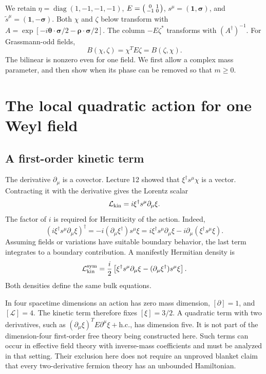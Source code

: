\documentclass[11pt]{article}
\newcommand{\Lag}{\mathcal{L}}
\newcommand{\one}{\mathbf 1}
\newcommand{\hc}{\mathrm{h.c.}}
\newcommand{\diag}{\operatorname{diag}}
\begin{document}
\begin{keyidea}
We retain \(\eta=\diag(1,-1,-1,-1)\),
\(E=\begin{psmallmatrix}0&1\\-1&0\end{psmallmatrix}\),
\(s^\mu=(\one,\bm\sigma)\), and
\(\widetilde s^\mu=(\one,-\bm\sigma)\).
Both \(\chi\) and \(\zeta\) below transform with
\(A=\exp[-i\bm\theta\cdot\bm\sigma/2-\bm\rho\cdot\bm\sigma/2]\).
The column \(-E\zeta^*\) transforms with \((A^\dagger)^{-1}\).
For Grassmann-odd fields,
\[
 B(\chi,\zeta)=\chi^T E\zeta=B(\zeta,\chi).
\]
The bilinear is nonzero even for one field. We first allow a complex
mass parameter, and then show when its phase can be removed so that
\(m\geq0\).
\end{keyidea}

\section{The local quadratic action for one Weyl field}
\subsection{A first-order kinetic term}
The derivative \(\partial_\mu\) is a covector. Lecture 12 showed that
\(\xi^\dagger s^\mu\chi\) is a vector. Contracting it with the
derivative gives the Lorentz scalar
\begin{equation}
 \Lag_{\rm kin}=i\xi^\dagger s^\mu\partial_\mu\xi.
 \label{weyl:eq:weylkin}
\end{equation}
The factor of \(i\) is required for Hermiticity of the action. Indeed,
\begin{equation}
 (i\xi^\dagger s^\mu\partial_\mu\xi)^\dagger
 =-i(\partial_\mu\xi^\dagger)s^\mu\xi
 =i\xi^\dagger s^\mu\partial_\mu\xi
     -i\partial_\mu(\xi^\dagger s^\mu\xi).
 \label{weyl:eq:hermkin}
\end{equation}
Assuming fields or variations have suitable boundary behavior, the
last term integrates to a boundary contribution. A manifestly
Hermitian density is
\begin{equation}
 \Lag_{\rm kin}^{\rm sym}
  =\frac{i}{2}\left[\xi^\dagger s^\mu\partial_\mu\xi
            -(\partial_\mu\xi^\dagger)s^\mu\xi\right].
 \label{weyl:eq:symkin}
\end{equation}
Both densities define the same bulk equations.

In four spacetime dimensions an action has zero mass dimension,
\([\partial]=1\), and \([\Lag]=4\). The kinetic term therefore fixes
\([\xi]=3/2\). A quadratic term with two derivatives, such as
\((\partial_\mu\xi)^T E\partial^\mu\xi+\hc\), has dimension five.
It is not part of the dimension-four first-order free theory being
constructed here. Such terms can occur in effective field theory with
inverse-mass coefficients and must be analyzed in that setting.
Their exclusion here does not require an unproved blanket claim that
every two-derivative fermion theory has an unbounded Hamiltonian.
\end{document}
